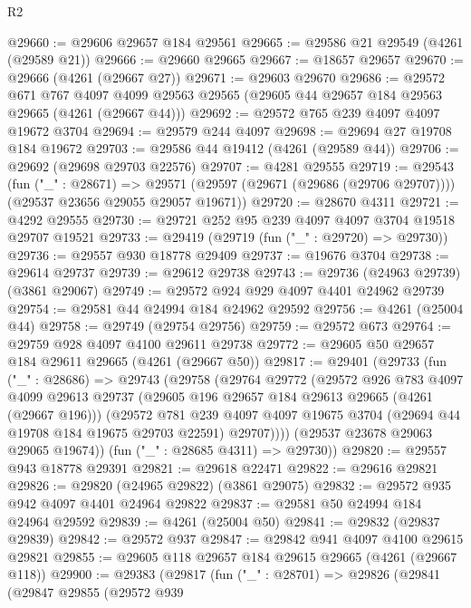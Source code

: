 \begin{lexlean}{R2}
\begin{coremodule}
@29660 := @29606 @29657 @184 @29561
@29665 := @29586 @21 @29549 (@4261 (@29589 @21))
@29666 := @29660 @29665
@29667 := @18657 @29657
@29670 := @29666 (@4261 (@29667 @27))
@29671 := @29603 @29670
@29686 := @29572
    @671
    @767
    @4097
    @4099
    @29563
    @29565
    (@29605 @44 @29657 @184 @29563 @29665 (@4261 (@29667 @44)))
@29692 := @29572 @765 @239 @4097 @4097 @19672 @3704
@29694 := @29579 @244 @4097
@29698 := @29694 @27 @19708 @184 @19672
@29703 := @29586 @44 @19412 (@4261 (@29589 @44))
@29706 := @29692 (@29698 @29703 @22576)
@29707 := @4281 @29555
@29719 := @29543
    (fun ("_" : @28671) =>
    @29571 (@29597 (@29671 (@29686 (@29706 @29707)))) (@29537 @23656 @29055 @29057 @19671))
@29720 := @28670 @4311
@29721 := @4292 @29555
@29730 := @29721 @252 @95 @239 @4097 @4097 @3704 @19518 @29707 @19521
@29733 := @29419 (@29719 (fun ("_" : @29720) => @29730))
@29736 := @29557 @930 @18778 @29409
@29737 := @19676 @3704
@29738 := @29614 @29737
@29739 := @29612 @29738
@29743 := @29736 (@24963 @29739) (@3861 @29067)
@29749 := @29572 @924 @929 @4097 @4401 @24962 @29739
@29754 := @29581 @44 @24994 @184 @24962 @29592
@29756 := @4261 (@25004 @44)
@29758 := @29749 (@29754 @29756)
@29759 := @29572 @673
@29764 := @29759 @928 @4097 @4100 @29611 @29738
@29772 := @29605 @50 @29657 @184 @29611 @29665 (@4261 (@29667 @50))
@29817 := @29401
    (@29733
      (fun ("_" : @28686) =>
      @29743
        (@29758
          (@29764
            @29772
            (@29572
              @926
              @783
              @4097
              @4099
              @29613
              @29737
              (@29605 @196 @29657 @184 @29613 @29665 (@4261 (@29667 @196)))
              (@29572
                @781
                @239
                @4097
                @4097
                @19675
                @3704
                (@29694 @44 @19708 @184 @19675 @29703 @22591)
                @29707))))
        (@29537 @23678 @29063 @29065 @19674))
      (fun ("_" : @28685 @4311) => @29730))
@29820 := @29557 @943 @18778 @29391
@29821 := @29618 @22471
@29822 := @29616 @29821
@29826 := @29820 (@24965 @29822) (@3861 @29075)
@29832 := @29572 @935 @942 @4097 @4401 @24964 @29822
@29837 := @29581 @50 @24994 @184 @24964 @29592
@29839 := @4261 (@25004 @50)
@29841 := @29832 (@29837 @29839)
@29842 := @29572 @937
@29847 := @29842 @941 @4097 @4100 @29615 @29821
@29855 := @29605 @118 @29657 @184 @29615 @29665 (@4261 (@29667 @118))
@29900 := @29383
    (@29817
      (fun ("_" : @28701) =>
      @29826
        (@29841
          (@29847
            @29855
            (@29572
              @939

\end{coremodule}
\end{lexlean}
